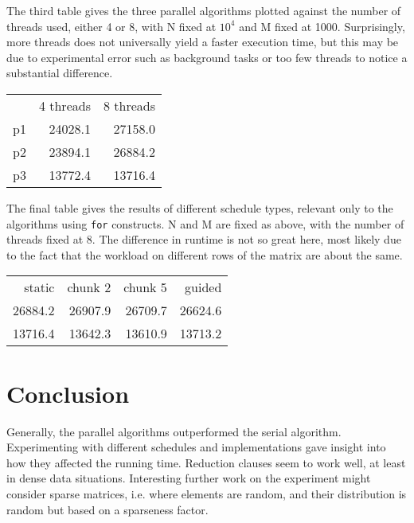 \documentclass[11pt]{article}
\begin{document}
The third table gives the three parallel algorithms plotted against
the number of threads used, either 4 or 8, with N fixed at $10^4$ and
M fixed at 1000. Surprisingly, more threads does not universally yield
a faster execution time, but this may be due to experimental error
such as background tasks or too few threads to notice a substantial
difference.

\begin{center}
\begin{tabular}{lrr}
 & 4 threads & 8 threads\\
p1 & 24028.1 & 27158.0\\
p2 & 23894.1 & 26884.2\\
p3 & 13772.4 & 13716.4\\
\end{tabular}
\end{center}


The final table gives the results of different schedule types,
relevant only to the algorithms using \verb~for~ constructs. N and M are
fixed as above, with the number of threads fixed at 8. The difference
in runtime is not so great here, most likely due to the fact that the
workload on different rows of the matrix are about the same.

\begin{center}
\begin{tabular}{rrrr}
static & chunk 2 & chunk 5 & guided\\
26884.2 & 26907.9 & 26709.7 & 26624.6\\
13716.4 & 13642.3 & 13610.9 & 13713.2\\
\end{tabular}
\end{center}

\section{Conclusion}
\label{sec-5}

Generally, the parallel algorithms outperformed the serial
algorithm. Experimenting with different schedules and implementations
gave insight into how they affected the running time. Reduction
clauses seem to work well, at least in dense data
situations. Interesting further work on the experiment might consider
sparse matrices, i.e. where elements are random, and their
distribution is random but based on a sparseness factor.
\end{document}
